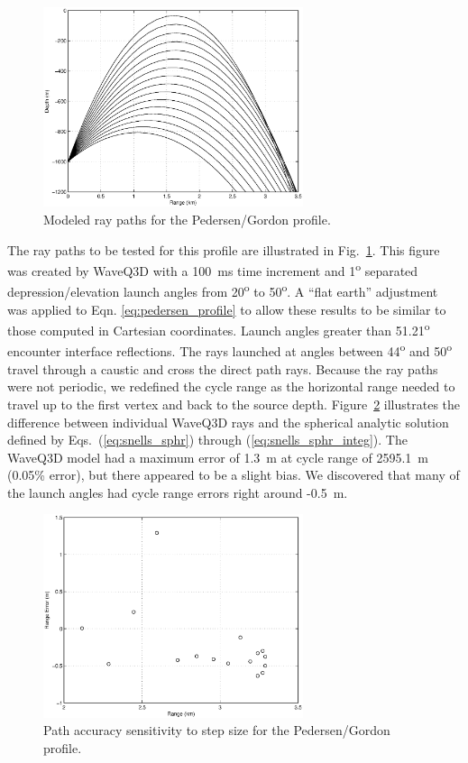 \documentclass{ws-jca}
\begin{document}
\begin{figure}[th]
	\centerline{\includegraphics[width=3in]{refraction_pedersen_range_wave.eps}} 
	\vspace*{8pt}
	\caption{Modeled ray paths for the Pedersen/Gordon profile. 
	\label{fig:refraction_pedersen_range_wave}}
\end{figure}
The ray paths to be tested for this profile are illustrated in
Fig.~\ref{fig:refraction_pedersen_range_wave}. This figure was created by
WaveQ3D with a 100~ms time increment and 1\textsuperscript{o} separated
depression/elevation launch angles from 20\textsuperscript{o} to
50\textsuperscript{o}. A ``flat earth'' adjustment was applied to Eqn.
\ref{eq:pedersen_profile} to allow these results to be similar to those
computed in Cartesian coordinates. Launch angles greater than
51.21\textsuperscript{o} encounter interface reflections. The rays launched
at angles between 44\textsuperscript{o} and 50\textsuperscript{o} travel
through a caustic and cross the direct path rays. Because the ray paths
were not periodic, we redefined the cycle range as the horizontal
range needed to travel up to the first vertex and back to the source depth.
Figure~\ref{fig:refraction_pedersen_range} illustrates the difference
between individual WaveQ3D rays and the spherical analytic solution defined
by Eqs.~(\ref{eq:snells_sphr}) through (\ref{eq:snells_sphr_integ}). The
WaveQ3D model had a maximum error of 1.3~m at cycle range of 2595.1~m
(0.05\% error), but there appeared to be a slight bias. We discovered that
many of the launch angles had cycle range errors right around -0.5~m.
\begin{figure}[th]
	\centerline{\includegraphics[width=3in]{refraction_pedersen_range.eps}} 
	\vspace*{8pt}
	\caption{Path accuracy sensitivity to step size for the Pedersen/Gordon profile. 
	\label{fig:refraction_pedersen_range}}
\end{figure}
\end{document}
